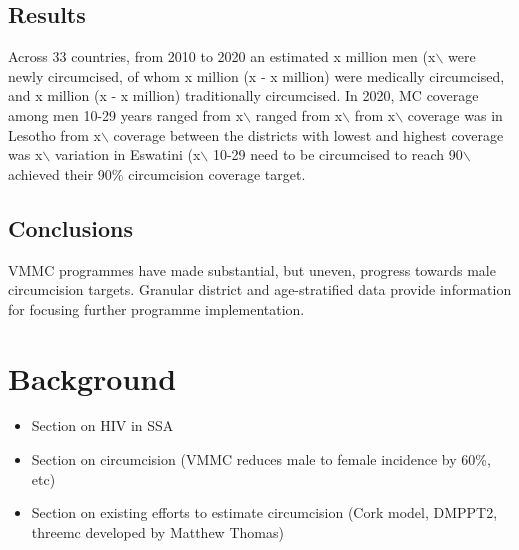 \documentclass{article}
\begin{document}
\subsection*{Results}
\label{sec:orgb447b73}
Across 33 countries, from 2010 to 2020 an estimated x million men (x$\backslash$%
were newly circumcised, of whom x million (x - x million) were medically circumcised, and
x million (x - x million) traditionally circumcised. In 2020, MC coverage among men 10-29
years ranged from x$\backslash$%
ranged from x$\backslash$%
from x$\backslash$%
coverage was in Lesotho from x$\backslash$%
coverage between the districts with lowest and highest coverage was x$\backslash$%
variation in Eswatini (x$\backslash$%
10-29 need to be circumcised to reach 90$\backslash$%
achieved their 90\% circumcision coverage target. 

\subsection*{Conclusions}
\label{sec:orge3e6bd2}
VMMC programmes have made substantial, but uneven, progress towards male circumcision targets. Granular district and age-stratified data provide information for focusing further programme implementation.


\section*{Background}
\label{sec:org526972c}

\begin{itemize}
\item Section on HIV in SSA
\item Section on circumcision (VMMC reduces male to female incidence by 60\%, etc)
\item Section on existing efforts to estimate circumcision (Cork model, DMPPT2, threemc developed by
Matthew Thomas)
\end{itemize}
\end{document}
